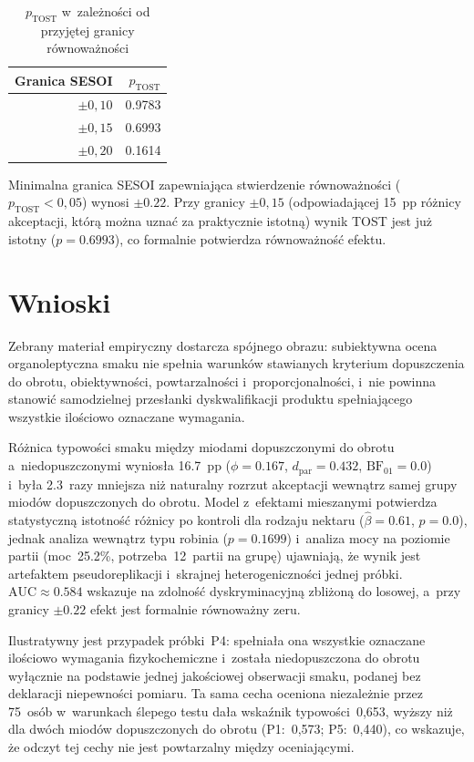 \begin{table}[h]
\centering
\caption{$p_{\mathrm{TOST}}$ w~zależności od przyjętej granicy równoważności}
\begin{tabular}{rr}
\toprule
Granica SESOI  & $p_{\mathrm{TOST}}$ \\
\midrule
$\pm 0{,}10$   & 0.9783 \\
$\pm 0{,}15$   & 0.6993 \\
$\pm 0{,}20$   & 0.1614 \\
\bottomrule
\end{tabular}
\end{table}

Minimalna granica SESOI zapewniająca stwierdzenie równoważności
($p_{\mathrm{TOST}} < 0{,}05$) wynosi $\pm 0.22$.
Przy granicy $\pm 0{,}15$ (odpowiadającej 15~pp różnicy akceptacji, którą
można uznać za praktycznie istotną) wynik TOST jest już istotny
($p = 0.6993$), co formalnie potwierdza równoważność efektu.

\section{Wnioski}

Zebrany materiał empiryczny dostarcza spójnego obrazu: subiektywna ocena
organoleptyczna smaku nie spełnia warunków stawianych kryterium
dopuszczenia do obrotu, obiektywności, powtarzalności i~proporcjonalności, 
i~nie powinna stanowić samodzielnej przesłanki dyskwalifikacji produktu
spełniającego wszystkie ilościowo oznaczane wymagania.

Różnica typowości smaku między miodami dopuszczonymi do obrotu
a~niedopuszczonymi wyniosła 16.7~pp
($\phi = 0.167$, $d_{\mathrm{par}} = 0.432$,
$\mathrm{BF}_{01} = 0.0$) i~była 2.3~razy mniejsza
niż naturalny rozrzut akceptacji wewnątrz samej grupy miodów dopuszczonych
do obrotu.
Model z~efektami mieszanymi potwierdza statystyczną istotność różnicy po
kontroli dla rodzaju nektaru ($\hat{\beta} = 0.61$,
$p = 0.0$), jednak analiza wewnątrz typu robinia ($p = 0.1699$)
i~analiza mocy na poziomie partii (moc~25.2\%,
potrzeba~12~partii na grupę) ujawniają, że wynik jest
artefaktem pseudoreplikacji i~skrajnej heterogeniczności jednej próbki.
$\mathrm{AUC} \approx 0.584$ wskazuje na zdolność dyskryminacyjną
zbliżoną do losowej, a~przy granicy $\pm 0.22$ efekt jest
formalnie równoważny zeru.

Ilustratywny jest przypadek próbki~P4: spełniała ona wszystkie oznaczane
ilościowo wymagania fizykochemiczne i~została niedopuszczona do obrotu
wyłącznie na podstawie jednej jakościowej obserwacji smaku, podanej bez
deklaracji niepewności pomiaru.
Ta sama cecha oceniona niezależnie przez 75~osób w~warunkach ślepego testu dała
wskaźnik typowości~0{,}653, wyższy niż dla dwóch miodów dopuszczonych do
obrotu (P1:~0{,}573; P5:~0{,}440), co wskazuje, że odczyt tej cechy nie jest
powtarzalny między oceniającymi.

